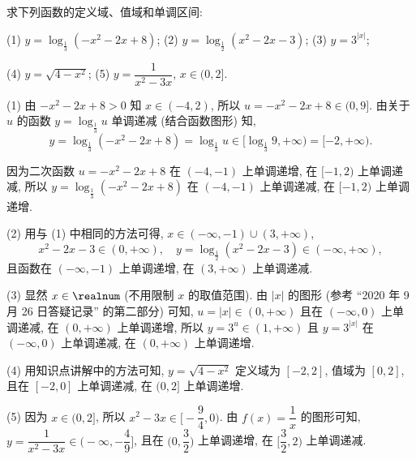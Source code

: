 \begin{example}
    求下列函数的定义域、值域和单调区间:
    
    (1) $y=\log_{\frac13} (-x^2-2x+8)$;\qquad
    (2) $y=\log_{\frac12}(x^2-2x-3)$;\qquad
    (3) $y=3^{|x|}$;
    
    (4) $y=\sqrt{4-x^2}$;\qquad 
    (5) $y=\dfrac1{x^2-3x}$, $x\in(0,2]$.
\end{example}
\begin{solution}
    (1) 由 $-x^2-2x+8> 0$ 知 $x\in(-4,2)$, 所以 $u= -x^2-2x+8\in (0,9]$. 由关于 $u$ 的函数 $y=\log_{\frac13} u$ 单调递减 (结合函数图形) 知, 
    \[y=\log_{\frac13} (-x^2-2x+8)= \log_{\frac13} u\in \biggl[\log_{\frac13} 9, +\infty\biggl)= [-2,+\infty).\]
    
    因为二次函数 $u= -x^2-2x+8$ 在 $(-4,-1)$ 上单调递增, 在 $[-1,2)$ 上单调递减, 所以 $y=\log_{\frac13} (-x^2-2x+8)$ 在 $(-4,-1)$ 上单调递减, 在 $[-1,2)$ 上单调递增.
    
    (2) 用与 (1) 中相同的方法可得, $x\in(-\infty,-1)\cup (3,+\infty)$, 
    \[x^2-2x-3\in (0,+\infty),\quad 
        y= \log_{\frac12}(x^2-2x-3)\in (-\infty,+\infty),\]
    且函数在 $(-\infty,-1)$ 上单调递增, 在 $(3,+\infty)$ 上单调递减.
    
    (3) 显然 $x\in\realnum$ (不用限制 $x$ 的取值范围). 由 $|x|$ 的图形 (参考 ``2020 年 9 月 26 日答疑记录'' 的第二部分) 可知, $u=|x|\in(0,+\infty)$ 且在 $(-\infty,0)$ 上单调递减, 在 $(0,+\infty)$ 上单调递增, 所以 $y=3^u\in(1,+\infty)$ 且 $y=3^{|x|}$ 在 $(-\infty,0)$ 上单调递减, 在 $(0,+\infty)$ 上单调递增.
    
    (4) 用知识点讲解中的方法可知, $y=\sqrt{4-x^2}$ 定义域为 $[-2,2]$, 值域为 $[0,2]$, 且在 $[-2,0]$ 上单调递减, 在 $(0,2]$ 上单调递增.
    
    (5) 因为 $x\in(0,2]$, 所以 $x^2-3x\in\biggl[-\dfrac94,0\biggr)$. 由 $f(x)=\dfrac1x$ 的图形可知, $y=\dfrac1{x^2-3x}\in\biggl(-\infty,-\dfrac49\biggr]$, 且在 $\biggl(0,\dfrac32\biggr)$ 上单调递增, 在 $\biggl[\dfrac32,2\biggr)$ 上单调递减.
\end{solution}